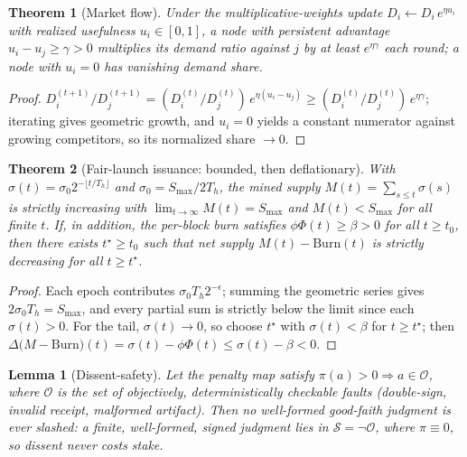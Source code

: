 \documentclass[11pt]{article}
\newtheorem{theorem}{Theorem}
\newtheorem{lemma}{Lemma}
\begin{document}
\begin{theorem}[Market flow]
\label{thm:flow}
Under the multiplicative-weights update $D_i\leftarrow D_i\,e^{\eta u_i}$ with realized usefulness $u_i\in[0,1]$, a node with persistent advantage $u_i-u_j\ge\gamma>0$ multiplies its demand ratio against $j$ by at least $e^{\eta\gamma}$ each round; a node with $u_i=0$ has vanishing demand share.
\end{theorem}
\begin{proof}
$D_i^{(t+1)}/D_j^{(t+1)}=(D_i^{(t)}/D_j^{(t)})\,e^{\eta(u_i-u_j)}\ge (D_i^{(t)}/D_j^{(t)})\,e^{\eta\gamma}$; iterating gives geometric growth, and $u_i=0$ yields a constant numerator against growing competitors, so its normalized share $\to0$.
\end{proof}

\begin{theorem}[Fair-launch issuance: bounded, then deflationary]
\label{thm:issue}
With $\sigma(t)=\sigma_0 2^{-\lfloor t/T_h\rfloor}$ and $\sigma_0=S_{\max}/2T_h$, the mined supply $M(t)=\sum_{s\le t}\sigma(s)$ is strictly increasing with $\lim_{t\to\infty}M(t)=S_{\max}$ and $M(t)<S_{\max}$ for all finite $t$. If, in addition, the per-block burn satisfies $\phi\Phi(t)\ge\beta>0$ for all $t\ge t_0$, then there exists $t^\star\ge t_0$ such that net supply $M(t)-\mathrm{Burn}(t)$ is strictly decreasing for all $t\ge t^\star$.
\end{theorem}
\begin{proof}
Each epoch contributes $\sigma_0 T_h 2^{-\epsilon}$; summing the geometric series gives $2\sigma_0 T_h=S_{\max}$, and every partial sum is strictly below the limit since each $\sigma(t)>0$. For the tail, $\sigma(t)\to0$, so choose $t^\star$ with $\sigma(t)<\beta$ for $t\ge t^\star$; then $\Delta\big(M-\mathrm{Burn}\big)(t)=\sigma(t)-\phi\Phi(t)\le\sigma(t)-\beta<0$.
\end{proof}

\begin{lemma}[Dissent-safety]
\label{lem:dissent}
Let the penalty map satisfy $\pi(a)>0\Rightarrow a\in\mathcal{O}$, where $\mathcal{O}$ is the set of objectively, deterministically checkable faults (double-sign, invalid receipt, malformed artifact). Then no well-formed good-faith judgment is ever \emph{slashed}: a finite, well-formed, signed judgment lies in $\mathcal S=\neg\mathcal O$, where $\pi\equiv0$, so dissent never costs stake.
\end{lemma}
\end{document}
